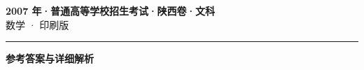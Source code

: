 \documentclass[zihao=5, a4paper]{ctexart}
\begin{document}
\begin{center}
  {\Large\bfseries 2007 年·普通高等学校招生考试·陕西卷·文科}\\[4pt]
  {\large 数学 · 印刷版}
\end{center}
\medskip
{}

\par\bigskip\hrule\bigskip
{}
\begin{center}{\large\bfseries 参考答案与详细解析}\end{center}
\smallskip

\end{document}
